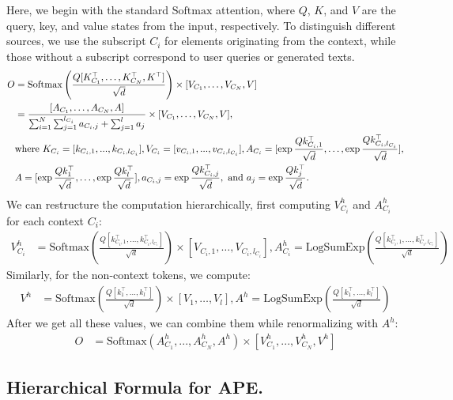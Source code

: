 Here, we begin with the standard $\mathrm{Softmax}$ attention, where $Q$, $K$, and $V$ are the query, key, and value states from the input, respectively. To distinguish different sources, we use the subscript ${C_i}$ for elements originating from the context, while those without a subscript correspond to user queries or generated texts.
\begin{align}
O &= \mathrm{Softmax}\left(\frac{Q[K_{C_1}^\top, \ldots, K_{C_N}^\top, K^\top]}{\sqrt{d}}\right) \times [V_{C_1}, \ldots, V_{C_N}, V] \\
&= \frac{ [A_{C_1}, \ldots, A_{C_N}, A]}{\sum_{i=1}^{N}\sum_{j=1}^{l_{C_i}}a_{C_{i}, j}+ \sum_{j=1}^{l}a_{j}}\times [V_{C_1}, \ldots, V_{C_N}, V], \\
&\text{where }K_{C_i} = [k_{C_i, 1}, ..., k_{C_i, l_{C_i}}], V_{C_i} = [v_{C_i, 1}, ..., v_{C_i, l_{C_i}}], A_{C_i} = [\exp \frac{Qk_{C_i, 1}^\top}{\sqrt{d}}, \ldots, \exp \frac{Qk_{C_i, l_{C_i}}^\top}{\sqrt{d}}],\notag\\
&A = [\exp \frac{Qk_{1}^\top}{\sqrt{d}}, \ldots, \exp \frac{Qk_{l}^\top}{\sqrt{d}}], a_{C_{i}, j} = \exp\frac{Qk_{C_i, j}^\top}{\sqrt{d}},\text{ and } a_{j} = \exp\frac{Qk_{j}^\top}{\sqrt{d}}.\notag
\end{align}
We can restructure the computation hierarchically, first computing $V^h_{C_i}$ and $A^h_{C_i}$ for each context $C_i$:
\begin{align} 
V^h_{C_i} &= \mathrm{Softmax} \left( \frac{Q [k_{C_i, 1}^\top, \ldots, k_{C_i, l_{C_i}}^\top]}{\sqrt{d}} \right) \times [V_{C_i, 1}, \ldots, V_{C_i, l_{C_i}}], A^h_{C_i} = \mathrm{LogSumExp} \left( \frac{Q [k_{C_i, 1}^\top, \ldots, k_{C_i, l_{C_i}}^\top]}{\sqrt{d}} \right) 
\end{align}
Similarly, for the non-context tokens, we compute:
\begin{align} 
V^h &= \mathrm{Softmax} \left( \frac{Q [k_1^\top, \ldots, k_l^\top]}{\sqrt{d}} \right) \times [V_1, \ldots, V_l], A^h = \mathrm{LogSumExp} \left( \frac{Q [k_1^\top, \ldots, k_l^\top]}{\sqrt{d}} \right) 
\end{align}
After we get all these values, we can combine them while renormalizing with $A^h$:
\begin{align} 
O &= \mathrm{Softmax} \left( A^h_{C_1}, ..., A^h_{C_N}, A^h \right) \times [V^h_{C_1}, ..., V^h_{C_N}, V^h]
\end{align}
\subsection{Hierarchical Formula for APE.}


